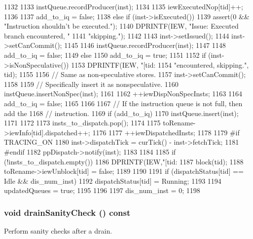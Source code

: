 \begin{DoxyCode}
{{{1132 
1133             instQueue.recordProducer(inst);
1134 
1135             iewExecutedNop[tid]++;
1136 
1137             add_to_iq = false;
1138         } else if (inst->isExecuted()) {
1139             assert(0 && "Instruction shouldn't be executed.\n");
1140             DPRINTF(IEW, "Issue: Executed branch encountered, "
1141                     "skipping.\n");
1142 
1143             inst->setIssued();
1144             inst->setCanCommit();
1145 
1146             instQueue.recordProducer(inst);
1147 
1148             add_to_iq = false;
1149         } else {
1150             add_to_iq = true;
1151         }
1152         if (inst->isNonSpeculative()) {
1153             DPRINTF(IEW, "[tid:%
1154                     "encountered, skipping.\n", tid);
1155 
1156             // Same as non-speculative stores.
1157             inst->setCanCommit();
1158 
1159             // Specifically insert it as nonspeculative.
1160             instQueue.insertNonSpec(inst);
1161 
1162             ++iewDispNonSpecInsts;
1163 
1164             add_to_iq = false;
1165         }
1166 
1167         // If the instruction queue is not full, then add the
1168         // instruction.
1169         if (add_to_iq) {
1170             instQueue.insert(inst);
1171         }
1172 
1173         insts_to_dispatch.pop();
1174 
1175         toRename->iewInfo[tid].dispatched++;
1176 
1177         ++iewDispatchedInsts;
1178 
1179 #if TRACING_ON
1180         inst->dispatchTick = curTick() - inst->fetchTick;
1181 #endif
1182         ppDispatch->notify(inst);
1183     }
1184 
1185     if (!insts_to_dispatch.empty()) {
1186         DPRINTF(IEW,"[tid:%
1187         block(tid);
1188         toRename->iewUnblock[tid] = false;
1189     }
1190 
1191     if (dispatchStatus[tid] == Idle && dis_num_inst) {
1192         dispatchStatus[tid] = Running;
1193 
1194         updatedQueues = true;
1195     }
1196 
1197     dis_num_inst = 0;
1198 }
\end{DoxyCode}
\hypertarget{classDefaultIEW_a0240eb42fa57fe5d3788093f62b77347}{
\subsubsection[{drainSanityCheck}]{\setlength{\rightskip}{0pt plus 5cm}void drainSanityCheck () const}}
\label{classDefaultIEW_a0240eb42fa57fe5d3788093f62b77347}
Perform sanity checks after a drain. 


